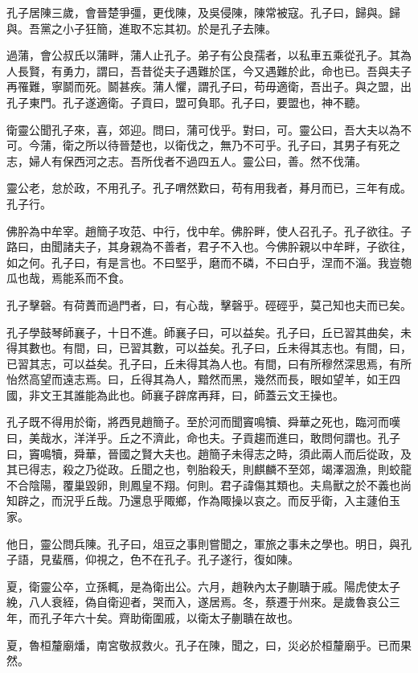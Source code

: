 孔子居陳三歲，會晉楚爭彊，更伐陳，及吳侵陳，陳常被寇。孔子曰，歸與。歸與。吾黨之小子狂簡，進取不忘其初。於是孔子去陳。

過蒲，會公叔氏以蒲畔，蒲人止孔子。弟子有公良孺者，以私車五乘從孔子。其為人長賢，有勇力，謂曰，吾昔從夫子遇難於匡，今又遇難於此，命也已。吾與夫子再罹難，寧鬬而死。鬬甚疾。蒲人懼，謂孔子曰，苟毋適衛，吾出子。與之盟，出孔子東門。孔子遂適衛。子貢曰，盟可負耶。孔子曰，要盟也，神不聽。

衛靈公聞孔子來，喜，郊迎。問曰，蒲可伐乎。對曰，可。靈公曰，吾大夫以為不可。今蒲，衛之所以待晉楚也，以衛伐之，無乃不可乎。孔子曰，其男子有死之志，婦人有保西河之志。吾所伐者不過四五人。靈公曰，善。然不伐蒲。

靈公老，怠於政，不用孔子。孔子喟然歎曰，苟有用我者，朞月而已，三年有成。孔子行。

佛肸為中牟宰。趙簡子攻范、中行，伐中牟。佛肸畔，使人召孔子。孔子欲往。子路曰，由聞諸夫子，其身親為不善者，君子不入也。今佛肸親以中牟畔，子欲往，如之何。孔子曰，有是言也。不曰堅乎，磨而不磷，不曰白乎，涅而不淄。我豈匏瓜也哉，焉能系而不食。

孔子擊磬。有荷蕢而過門者，曰，有心哉，擊磬乎。硜硜乎，莫己知也夫而已矣。

孔子學鼓琴師襄子，十日不進。師襄子曰，可以益矣。孔子曰，丘已習其曲矣，未得其數也。有間，曰，已習其數，可以益矣。孔子曰，丘未得其志也。有間，曰，已習其志，可以益矣。孔子曰，丘未得其為人也。有間，曰有所穆然深思焉，有所怡然高望而遠志焉。曰，丘得其為人，黯然而黑，幾然而長，眼如望羊，如王四國，非文王其誰能為此也。師襄子辟席再拜，曰，師蓋云文王操也。

孔子既不得用於衛，將西見趙簡子。至於河而聞竇鳴犢、舜華之死也，臨河而嘆曰，美哉水，洋洋乎。丘之不濟此，命也夫。子貢趨而進曰，敢問何謂也。孔子曰，竇鳴犢，舜華，晉國之賢大夫也。趙簡子未得志之時，須此兩人而后從政，及其已得志，殺之乃從政。丘聞之也，刳胎殺夭，則麒麟不至郊，竭澤涸漁，則蛟龍不合陰陽，覆巢毀卵，則鳳皇不翔。何則。君子諱傷其類也。夫鳥獸之於不義也尚知辟之，而況乎丘哉。乃還息乎陬鄉，作為陬操以哀之。而反乎衛，入主蘧伯玉家。

他日，靈公問兵陳。孔子曰，俎豆之事則嘗聞之，軍旅之事未之學也。明日，與孔子語，見蜚鴈，仰視之，色不在孔子。孔子遂行，復如陳。

夏，衛靈公卒，立孫輒，是為衛出公。六月，趙鞅內太子蒯聵于戚。陽虎使太子絻，八人衰絰，偽自衛迎者，哭而入，遂居焉。冬，蔡遷于州來。是歲魯哀公三年，而孔子年六十矣。齊助衛圍戚，以衛太子蒯聵在故也。

夏，魯桓釐廟燔，南宮敬叔救火。孔子在陳，聞之，曰，災必於桓釐廟乎。已而果然。

